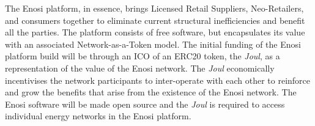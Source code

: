 \documentclass[a4paper,12pt,reqno]{amsart}
\theoremstyle{definition}
\begin{document}
The Enosi platform, in essence, brings Licensed Retail Suppliers, Neo-Retailers, and consumers together to eliminate current structural inefficiencies and benefit all the parties. The platform consists of free software, but encapsulates its value with an associated Network-as-a-Token model. The initial funding of the Enosi platform build will be through an ICO of an ERC20 token, the \textit{Joul}, as a representation of the value of the Enosi network. The \textit{Joul} economically incentivises the network participants to inter-operate with each other to reinforce and grow the benefits that arise from the existence of the Enosi network. The Enosi software will be made open source and the \textit{Joul} is required to access individual energy networks in the Enosi platform. 
% 
% 
% 


\newpage
\end{document}
